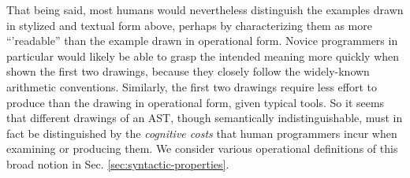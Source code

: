 That being said, most humans would nevertheless distinguish the examples drawn in stylized and textual form above, perhaps by characterizing them as more ``'readable'' than the example drawn in operational form. Novice programmers in particular would likely be able to grasp the intended meaning more quickly when shown the first two drawings, because they closely follow the widely-known arithmetic conventions. Similarly, the first two drawings  require less effort to produce than the drawing in operational form, given typical tools. %
So it seems that different drawings of an AST, though semantically indistinguishable, must in fact be distinguished by the \emph{cognitive costs}  that human programmers incur when examining or producing them. We consider various operational definitions of this broad notion in Sec. \ref{sec:syntactic-properties}. %

